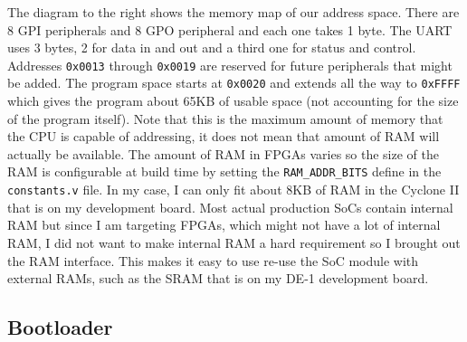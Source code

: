 \documentclass[10pt]{article}
\begin{document}
        The diagram to the right shows the memory map of our address space.
        There are 8 GPI peripherals and 8 GPO peripheral and each one takes 1
        byte.  The UART uses 3 bytes, 2 for data in and out and a third one for
        status and control.  Addresses \texttt{0x0013} through \texttt{0x0019}
        are reserved for future peripherals that might be added. The program
        space starts at \texttt{0x0020} and extends all the way to
        \texttt{0xFFFF} which gives the program about 65KB of usable space (not
        accounting for the size of the program itself). Note that this is the
        maximum amount of memory that the CPU is capable of addressing, it does
        not mean that amount of RAM will actually be available. The amount of
        RAM in FPGAs varies so the size of the RAM is configurable at build
        time by setting the \texttt{RAM\_ADDR\_BITS} define in the
        \texttt{constants.v} file. In my case, I can only fit about 8KB of RAM
        in the Cyclone II that is on my development board. Most actual
        production SoCs contain internal RAM but since I am targeting FPGAs,
        which might not have a lot of internal RAM, I did not want to make
        internal RAM a hard requirement so I brought out the RAM interface.
        This makes it easy to use re-use the SoC module with external RAMs,
        such as the SRAM that is on my DE-1 development board.

    \subsection{Bootloader}
\end{document}

